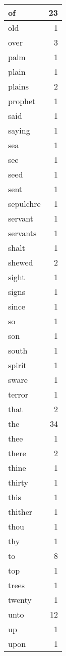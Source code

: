\begin{center}
\begin{longtable}{l|r}
of & 23 \\ \hline
old & 1 \\ \hline
over & 3 \\ \hline
palm & 1 \\ \hline
plain & 1 \\ \hline
plains & 2 \\ \hline
prophet & 1 \\ \hline
said & 1 \\ \hline
saying & 1 \\ \hline
sea & 1 \\ \hline
see & 1 \\ \hline
seed & 1 \\ \hline
sent & 1 \\ \hline
sepulchre & 1 \\ \hline
servant & 1 \\ \hline
servants & 1 \\ \hline
shalt & 1 \\ \hline
shewed & 2 \\ \hline
sight & 1 \\ \hline
signs & 1 \\ \hline
since & 1 \\ \hline
so & 1 \\ \hline
son & 1 \\ \hline
south & 1 \\ \hline
spirit & 1 \\ \hline
sware & 1 \\ \hline
terror & 1 \\ \hline
that & 2 \\ \hline
the & 34 \\ \hline
thee & 1 \\ \hline
there & 2 \\ \hline
thine & 1 \\ \hline
thirty & 1 \\ \hline
this & 1 \\ \hline
thither & 1 \\ \hline
thou & 1 \\ \hline
thy & 1 \\ \hline
to & 8 \\ \hline
top & 1 \\ \hline
trees & 1 \\ \hline
twenty & 1 \\ \hline
unto & 12 \\ \hline
up & 1 \\ \hline
upon & 1 \\ \hline

\end{longtable}
\end{center}
